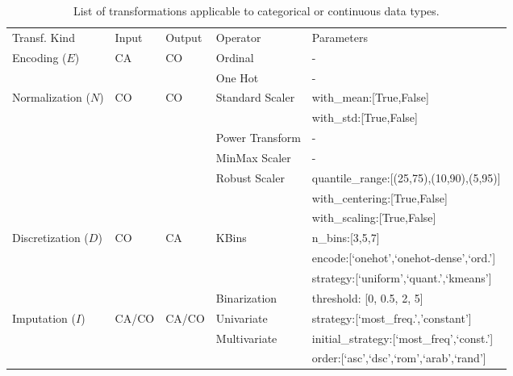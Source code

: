 \begin{example}

\begin{table}[!t]
\renewcommand{\arraystretch}{0.3}
\footnotesize
\caption{List of transformations applicable to categorical or continuous data types.}
\centering
\begin{threeparttable}

\begin{tabular}{@{}p{30mm}lll>{\ttfamily}l@{}}
\toprule
Transf. Kind& Input & Output & Operator & \textnormal{Parameters}
\\	\cmidrule[.1em]{1-5}

Encoding ($E$)  & CA & CO & Ordinal & -  \\ \cmidrule[.05em]{4-5} & & & One Hot & - \\
\cmidrule[.1em]{1-5}

Normalization ($N$) & CO & CO & Standard Scaler & with\_mean:[True,False]\\ \cmidrule[.05em]{4-5} & & & & with\_std:[True,False] \\ \cmidrule[.05em]{4-5}
&  &  & Power Transform & -\\ \cmidrule[.05em]{4-5}
&  &  & MinMax Scaler & -\\ \cmidrule[.05em]{4-5}
&  &  & Robust Scaler & quantile\_range:[(25,75),(10,90),(5,95)]\\ \cmidrule[.05em]{4-5} & & & & with\_centering:[True,False]\\ \cmidrule[.05em]{4-5} & & & & with\_scaling:[True,False] \\
\cmidrule[.1em]{1-5}

Discretization ($D$) & CO & CA & KBins & n\_bins:[3,5,7]\\ \cmidrule[.05em]{4-5} & & & & encode:[`onehot',`onehot-dense',`ord.']\\ \cmidrule[.05em]{4-5} & & & & strategy:[`uniform',`quant.',`kmeans']\\	\cmidrule[.05em]{4-5}
&  &  & Binarization  & threshold: [0, 0.5, 2, 5]\\	\cmidrule[.1em]{1-5}

Imputation ($I$) & CA/CO & CA/CO  & Univariate & strategy:[`most\_freq.','constant'] \\	\cmidrule[.05em]{4-5}
 & &  & Multivariate & initial\_strategy:[`most\_freq',`const.']\\ \cmidrule[.05em]{4-5} & & & & order:[`asc',`dsc',`rom',`arab',`rand'] \\	\cmidrule[.1em]{1-5}


\end{tabular}
\end{threeparttable}
\end{table}
\end{example}
